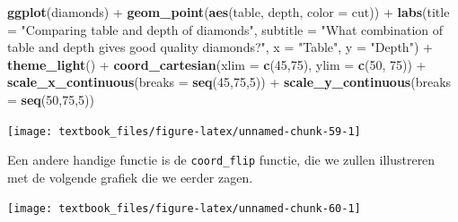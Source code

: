 \documentclass[]{tufte-book}
\newenvironment{Shaded}{}{}
\newcommand{\DataTypeTok}[1]{\textcolor[rgb]{0.56,0.13,0.00}{#1}}
\newcommand{\DecValTok}[1]{\textcolor[rgb]{0.25,0.63,0.44}{#1}}
\newcommand{\KeywordTok}[1]{\textcolor[rgb]{0.00,0.44,0.13}{\textbf{#1}}}
\newcommand{\NormalTok}[1]{#1}
\newcommand{\OperatorTok}[1]{\textcolor[rgb]{0.40,0.40,0.40}{#1}}
\newcommand{\StringTok}[1]{\textcolor[rgb]{0.25,0.44,0.63}{#1}}
\begin{document}
\begin{Shaded}
\begin{Highlighting}[]
\KeywordTok{ggplot}\NormalTok{(diamonds) }\OperatorTok{+}
\StringTok{    }\KeywordTok{geom_point}\NormalTok{(}\KeywordTok{aes}\NormalTok{(table, depth, }\DataTypeTok{color =}\NormalTok{ cut)) }\OperatorTok{+}\StringTok{ }
\StringTok{    }\KeywordTok{labs}\NormalTok{(}\DataTypeTok{title =} \StringTok{"Comparing table and depth of diamonds"}\NormalTok{,}
         \DataTypeTok{subtitle =} \StringTok{"What combination of table}
\StringTok{         and depth gives good quality diamonds?"}\NormalTok{,}
         \DataTypeTok{x =} \StringTok{"Table"}\NormalTok{,}
         \DataTypeTok{y =} \StringTok{"Depth"}\NormalTok{) }\OperatorTok{+}
\StringTok{    }\KeywordTok{theme_light}\NormalTok{() }\OperatorTok{+}
\StringTok{    }\KeywordTok{coord_cartesian}\NormalTok{(}\DataTypeTok{xlim =} \KeywordTok{c}\NormalTok{(}\DecValTok{45}\NormalTok{,}\DecValTok{75}\NormalTok{), }\DataTypeTok{ylim =} \KeywordTok{c}\NormalTok{(}\DecValTok{50}\NormalTok{, }\DecValTok{75}\NormalTok{)) }\OperatorTok{+}
\StringTok{    }\KeywordTok{scale_x_continuous}\NormalTok{(}\DataTypeTok{breaks =} \KeywordTok{seq}\NormalTok{(}\DecValTok{45}\NormalTok{,}\DecValTok{75}\NormalTok{,}\DecValTok{5}\NormalTok{)) }\OperatorTok{+}
\StringTok{    }\KeywordTok{scale_y_continuous}\NormalTok{(}\DataTypeTok{breaks =} \KeywordTok{seq}\NormalTok{(}\DecValTok{50}\NormalTok{,}\DecValTok{75}\NormalTok{,}\DecValTok{5}\NormalTok{))}
\end{Highlighting}
\end{Shaded}

\texttt{[image: textbook\_files/figure-latex/unnamed-chunk-59-1]}

Een andere handige functie is de \texttt{coord\_flip} functie, die we zullen illustreren met de volgende grafiek die we eerder zagen.

\begin{Shaded}
\end{Shaded}

\texttt{[image: textbook\_files/figure-latex/unnamed-chunk-60-1]}
\end{document}
